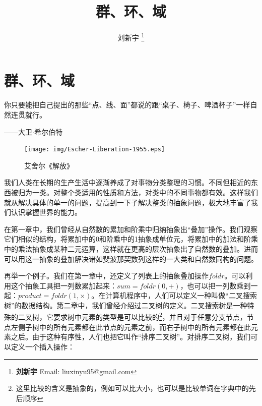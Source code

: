 \documentclass{article}
\begin{document}
\title{群、环、域}

\author{刘新宇
\thanks{{\bfseries 刘新宇} \newline
  Email: liuxinyu95@gmail.com \newline}
  }

\maketitle
\fi


\ifx\wholebook\relax
\chapter{群、环、域}
\fi

\epigraph{你只要能把自己提出的那些“点、线、面”都说的跟“桌子、椅子、啤酒杯子”一样自然连贯就行。}{——大卫$\cdot$希尔伯特}


\begin{figure}
 \centering
 \texttt{[image: img/Escher-Liberation-1955.eps]}
 \captionsetup{labelformat=empty}
 \caption{艾舍尔《解放》}
 \label{fig:Escher-liberation}
\end{figure}

我们人类在长期的生产生活中逐渐养成了对事物分类整理的习惯。不同但相近的东西被归为一类。对整个类适用的性质和方法，对类中的不同事物都有效。这样我们就从解决具体的单一的问题，提高到一下子解决整类的抽象问题，极大地丰富了我们认识掌握世界的能力。

在第一章中，我们曾经从自然数的累加和阶乘中归纳抽象出“叠加”操作。我们观察它们相似的结构，将累加中的0和阶乘中的1抽象成单位元，将累加中的加法和阶乘中的乘法抽象成某种二元运算，这样就在更高的层次抽象出了自然数的叠加。进而可以用这一抽象的叠加解决诸如斐波那契数列这样的一大类和自然数同构的问题。

再举一个例子。我们在第一章中，还定义了列表上的抽象叠加操作$foldr$。可以利用这个抽象工具把一列数累加起来：$sum = foldr(0, +)$，也可以把一列数乘到一起：$product = foldr(1, \times)$。在计算机程序中，人们可以定义一种叫做“二叉搜索树”的数据结构。第二章中，我们曾经介绍过二叉树的定义。二叉搜索树是一种特殊的二叉树，它要求树中元素的类型是可以比较的\footnote{这里比较的含义是抽象的，例如可以比大小，也可以是比较单词在字典中的先后顺序}，并且对于任意分支节点，节点左侧子树中的所有元素都在此节点的元素之前，而右子树中的所有元素都在此元素之后。由于这种有序性，人们也把它叫作“排序二叉树”。对排序二叉树，我们可以定义一个插入操作：
\end{document}
